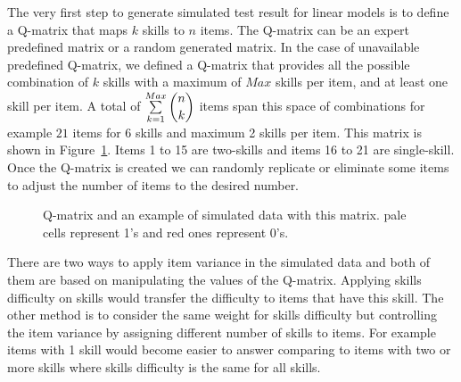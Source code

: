


The very first step to generate simulated test result for linear models is to define a Q-matrix that maps $k$ skills to $n$ items. The Q-matrix can be an expert predefined matrix or a random generated matrix. In the case of unavailable predefined Q-matrix, we defined a Q-matrix that provides all the possible combination of $k$ skills with a maximum of $Max$ skills per item, and at least one skill per item. A total of $\sum\limits_{k=1}^{Max} \dbinom{n}{k}$ items span this space of combinations for example $21$ items for 6 skills and maximum 2 skills per item. This matrix is shown in Figure~\ref{figqmatrixandResutM}. Items 1 to 15 are two-skills and items 16 to 21 are single-skill. Once the Q-matrix is created we can randomly replicate or eliminate some items to adjust the number of items to the desired number. 

\begin{figure}[ht]
\centering

\quad
\caption{Q-matrix and an example of simulated data with this matrix.  pale cells represent 1's and red ones represent 0's.}
\label{figqmatrixandResutM}
\end{figure}

There are two ways to apply item variance in the simulated data and both of them are based on manipulating the values of the Q-matrix. Applying skills difficulty on skills would transfer the difficulty to items that have this skill. The other method is to consider the same weight for skills difficulty but controlling the item variance by assigning different number of skills to items. For example items with 1 skill would become easier to answer comparing to items with two or more skills where skills difficulty is the same for all skills. 

